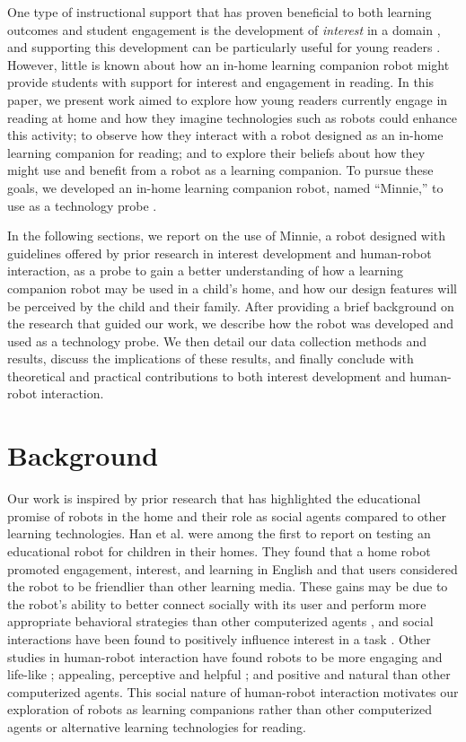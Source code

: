 \documentclass{sigchi}
\begin{document}
One type of instructional support that has proven beneficial to both learning outcomes and student engagement is the development of \textit{interest} in a domain \cite{Hidi:2006}, and supporting this development can be particularly useful for young readers \cite{Jones:2011}. However, little is known about how an in-home learning companion robot might provide students with support for interest and engagement in reading. In this paper, we present work aimed to explore how young readers currently engage in reading at home and how they imagine technologies such as robots could enhance this activity; to observe how they interact with a robot designed as an in-home learning companion for reading; and to explore their beliefs about how they might use and benefit from a robot as a learning companion. To pursue these goals, we developed an in-home learning companion robot, named ``Minnie,'' to use as a technology probe \cite{Hutchinson:2003}.

In the following sections, we report on the use of Minnie, a robot designed with guidelines offered by prior research in interest development and human-robot interaction, as a probe to gain a better understanding of how a learning companion robot may be used in a child's home, and how our design features will be perceived by the child and their family. After providing a brief background on the research that guided our work, we describe how the robot was developed and used as a technology probe. We then detail our data collection methods and results, discuss the implications of these results, and finally conclude with theoretical and practical contributions to both interest development and human-robot interaction.

\section{Background}
Our work is inspired by prior research that has highlighted the educational promise of robots in the home and their role as social agents compared to other learning technologies. Han et al. \cite{Han:2005} were among the first to report on testing an educational robot for children in their homes. They found that a home robot promoted engagement, interest, and learning in English and that users considered the robot to be friendlier than other learning media. These gains may be due to the robot's ability to better connect socially with its user and perform more appropriate behavioral strategies than other computerized agents \cite{Brown:2013}, and social interactions have been found to positively influence interest in a task \cite{Sansone:2005}. Other studies in human-robot interaction have found robots to be more engaging and life-like \cite{Kiesler:2008}; appealing, perceptive and helpful \cite{Wainer:2007}; and positive and natural \cite{Bainbridge:2011} than other computerized agents. This social nature of human-robot interaction motivates our exploration of robots as learning companions rather than other computerized agents or alternative learning technologies for reading.
\end{document}
